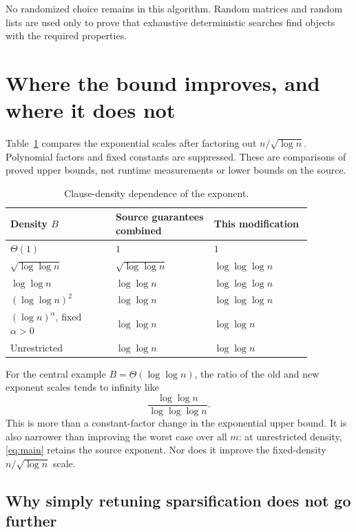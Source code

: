 \documentclass[11pt]{article}
\numberwithin{equation}{section}
\theoremstyle{definition}\newtheorem{definition}[theorem]{Definition}
\theoremstyle{remark}\newtheorem{remark}[theorem]{Remark}
\begin{document}
No randomized choice remains in this algorithm. Random matrices and
random lists are used only to prove that exhaustive deterministic
searches find objects with the required properties.

\section{Where the bound improves, and where it does not}
\label{sec:scope}

Table~\ref{tab:comparison} compares the exponential scales after
factoring out $n/\sqrt{\log n}$. Polynomial factors and fixed
constants are suppressed. These are comparisons of proved upper
bounds, not runtime measurements or lower bounds on the source.

\begin{table}[htbp]
\centering
\caption{Clause-density dependence of the exponent.}
\label{tab:comparison}
\begin{tabular}{@{}p{0.30\linewidth}p{0.29\linewidth}p{0.28\linewidth}@{}}
\toprule
Density $B$ & Source guarantees combined & This modification\\
\midrule
$\Theta(1)$ & $1$ & $1$\\[0.4em]
$\sqrt{\log\log n}$ & $\sqrt{\log\log n}$ & $\log\log\log n$\\[0.4em]
$\log\log n$ & $\log\log n$ & $\log\log\log n$\\[0.4em]
$(\log\log n)^2$ & $\log\log n$ & $\log\log\log n$\\[0.4em]
$(\log n)^\alpha$, fixed $\alpha>0$ & $\log\log n$ & $\log\log n$\\[0.4em]
Unrestricted & $\log\log n$ & $\log\log n$\\
\bottomrule
\end{tabular}
\end{table}

For the central example $B=\Theta(\log\log n)$, the ratio of the
old and new exponent scales tends to infinity like
\[
 \frac{\log\log n}{\log\log\log n}.
\]
This is more than a constant-factor change in the exponential
upper bound. It is also narrower than improving the worst case over
all $m$: at unrestricted density, \eqref{eq:main} retains the source
exponent. Nor does it improve the fixed-density
$n/\sqrt{\log n}$ scale.

\subsection{Why simply retuning sparsification does not go further}
\end{document}
